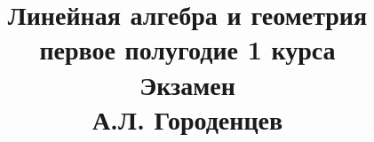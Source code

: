 \documentclass[fleqn]{article}
\title{Линейная алгебра и геометрия \\ первое полугодие 1 курса \\ Экзамен \\ А.Л. Городенцев}
\begin{document}
	\maketitle
	\pagebreak
	
	
	\tableofcontents
	
	\newpage
	
			
\end{document}
